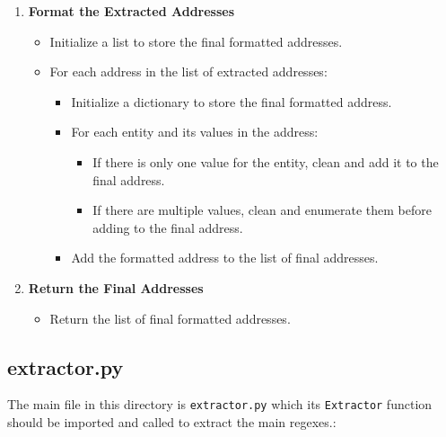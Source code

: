 \documentclass{solutionclass} %
\def\co#1{\texttt{#1}}
\begin{document}
\begin{solution}
\begin{enumerate}
    \item \textbf{Format the Extracted Addresses}
    \begin{itemize}
        \item Initialize a list to store the final formatted addresses.
        \item For each address in the list of extracted addresses:
        \begin{itemize}
            \item Initialize a dictionary to store the final formatted address.
            \item For each entity and its values in the address:
            \begin{itemize}
                \item If there is only one value for the entity, clean and add it to the final address.
                \item If there are multiple values, clean and enumerate them before adding to the final address.
            \end{itemize}
            \item Add the formatted address to the list of final addresses.
        \end{itemize}
    \end{itemize}

    \item \textbf{Return the Final Addresses}
    \begin{itemize}
        \item Return the list of final formatted addresses.
    \end{itemize}
\end{enumerate} 

\end{solution}

\subsection*{extractor.py}
\begin{solution}
The main file in this directory is \verb*|extractor.py| which its \co{Extractor} function should be imported and called to extract the main regexes.:
\end{solution}
\end{document}
